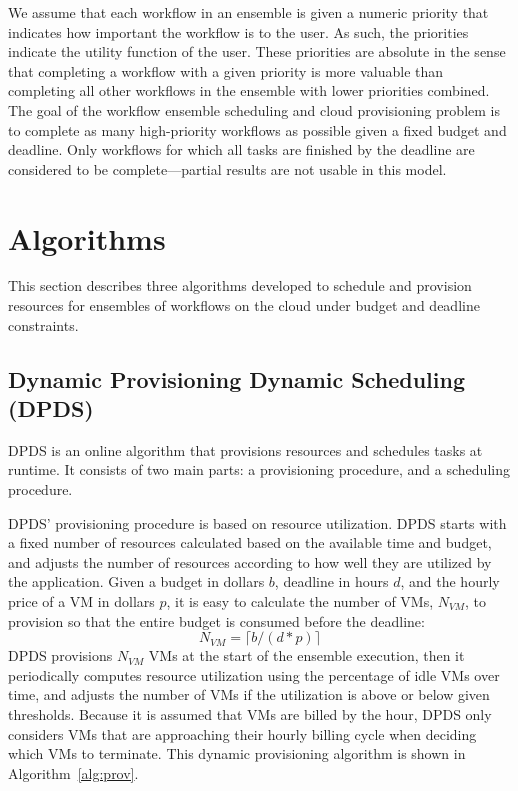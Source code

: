 \documentclass[conference]{IEEEtran}
\begin{document}
We assume that each workflow in an ensemble is given a numeric priority that indicates how
important the workflow is to the user. As such, the priorities indicate the
utility function of the user. These priorities are absolute in the sense that
completing a workflow with a given priority is more valuable than completing all other workflows in the ensemble with lower
priorities combined. The goal of the workflow ensemble scheduling and cloud
provisioning problem is to complete as many high-priority workflows as possible
given a fixed budget and deadline. Only workflows for which all tasks are
finished by the deadline are considered to be complete---partial results are not
usable in this model.



\section{Algorithms}
\label{sec:algorithms}

This section describes three algorithms developed to schedule and provision resources for ensembles of workflows on the cloud under budget and deadline constraints.

\subsection{Dynamic Provisioning Dynamic Scheduling (DPDS)}
\label{sec:dpds}

DPDS is an online algorithm that provisions resources and schedules tasks at
runtime. It consists of two main parts: a provisioning procedure, and a
scheduling procedure.


DPDS' provisioning procedure is based on resource utilization. DPDS starts with
a fixed number of resources calculated based on the available time and budget,
and adjusts the number of resources according to how well they are utilized by
the application.
Given a budget in dollars $b$, deadline in hours $d$, and the hourly price of a
VM in dollars $p$, it is easy to calculate the number of VMs, $N_{VM}$, to
provision so that the entire budget is consumed before the deadline:
\begin{equation}
\label{eq:static-plan}
N_{VM} = \lceil b / (d * p) \rceil
\end{equation}
%
DPDS provisions $N_{VM}$ VMs at the start of the ensemble execution, then
it periodically computes resource
utilization using the percentage of idle VMs over time, and adjusts the number
of VMs if the utilization is above or below given thresholds. Because it is
assumed that VMs are billed by the hour, DPDS only considers VMs that are
approaching their hourly billing cycle when deciding which VMs to terminate.
This dynamic provisioning algorithm is shown in Algorithm~\ref{alg:prov}.
\end{document}
